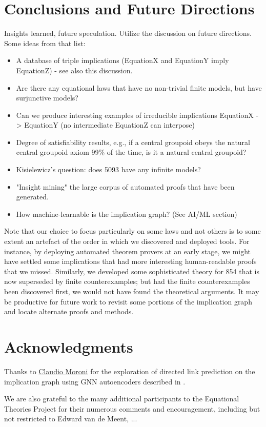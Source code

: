\section{Conclusions and Future Directions}


Insights learned, future speculation. Utilize the discussion on future directions. Some ideas from that list:

\begin{itemize}
  \item A database of triple implications (EquationX and EquationY imply EquationZ) - see also this discussion.
  \item Are there any equational laws that have no non-trivial finite models, but have surjunctive models?
  \item Can we produce interesting examples of irreducible implications EquationX -> EquationY (no intermediate EquationZ can interpose)
  \item Degree of satisfiability results, e.g., if a central groupoid obeys the natural central groupoid axiom 99\% of the time, is it a natural central groupoid?
  \item Kisielewicz's question: does 5093 have any infinite models?
  \item "Insight mining" the large corpus of automated proofs that have been generated.
  \item How machine-learnable is the implication graph? (See AI/ML section)
\end{itemize}

Note that our choice to focus particularly on some laws and not others is to some extent an artefact of the order in which we discovered and deployed tools.  For instance, by deploying automated theorem provers at an early stage, we might have settled some implications that had more interesting human-readable proofs that we missed.  Similarly, we developed some sophisticated theory for 854 that is now superseded by finite counterexamples; but had the finite counterexamples been discovered first, we would not have found the theoretical arguments.  It may be productive for future work to revisit some portions of the implication graph and locate alternate proofs and methods.

\section*{Acknowledgments}

Thanks to \href{https://github.com/ClaudMor}{Claudio Moroni} for the exploration of directed link prediction
on the implication graph using GNN autoencoders described in .

We are also grateful to the many additional participants to the Equational Theories Project for their numerous comments and encouragement, including but not restricted to Edward van de Meent, ...
